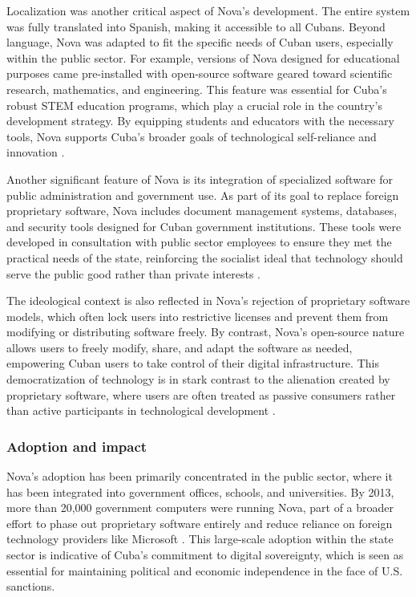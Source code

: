 \begin{refsection}
Localization was another critical aspect of Nova’s development. The entire system was fully translated into Spanish, making it accessible to all Cubans. Beyond language, Nova was adapted to fit the specific needs of Cuban users, especially within the public sector. For example, versions of Nova designed for educational purposes came pre-installed with open-source software geared toward scientific research, mathematics, and engineering. This feature was essential for Cuba’s robust STEM education programs, which play a crucial role in the country’s development strategy. By equipping students and educators with the necessary tools, Nova supports Cuba’s broader goals of technological self-reliance and innovation \cite[pp.~56-87]{kapcia}.

Another significant feature of Nova is its integration of specialized software for public administration and government use. As part of its goal to replace foreign proprietary software, Nova includes document management systems, databases, and security tools designed for Cuban government institutions. These tools were developed in consultation with public sector employees to ensure they met the practical needs of the state, reinforcing the socialist ideal that technology should serve the public good rather than private interests \cite[pp.~23-45]{feinberg}. 

The ideological context is also reflected in Nova’s rejection of proprietary software models, which often lock users into restrictive licenses and prevent them from modifying or distributing software freely. By contrast, Nova’s open-source nature allows users to freely modify, share, and adapt the software as needed, empowering Cuban users to take control of their digital infrastructure. This democratization of technology is in stark contrast to the alienation created by proprietary software, where users are often treated as passive consumers rather than active participants in technological development \cite[pp.~90-112]{kapcia}.

\subsubsection{Adoption and impact}

Nova’s adoption has been primarily concentrated in the public sector, where it has been integrated into government offices, schools, and universities. By 2013, more than 20,000 government computers were running Nova, part of a broader effort to phase out proprietary software entirely and reduce reliance on foreign technology providers like Microsoft \cite[pp.~45-67]{feinberg}. This large-scale adoption within the state sector is indicative of Cuba’s commitment to digital sovereignty, which is seen as essential for maintaining political and economic independence in the face of U.S. sanctions.


\end{refsection}
